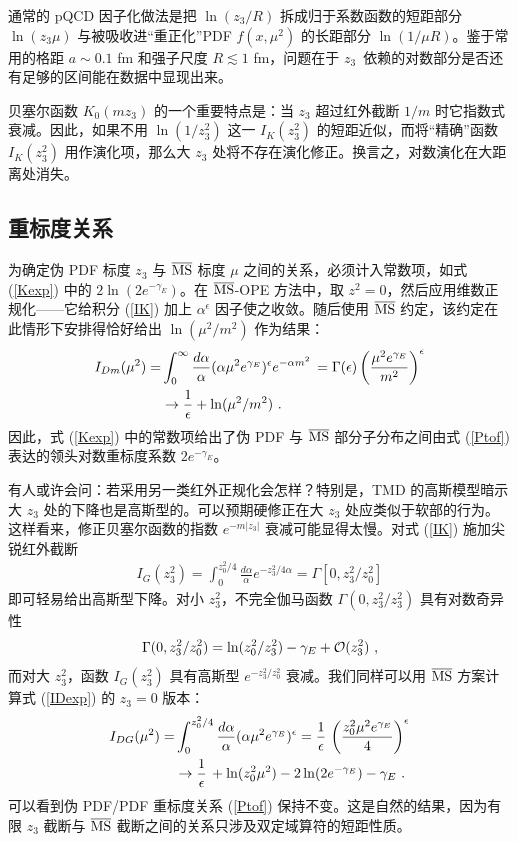 通常的 pQCD 因子化做法是把 $\ln (z_3/ R)$ 拆成归于系数函数的短距部分 $\ln (z_3 \mu)$ 与被吸收进``重正化''PDF $f(x,\mu^2)$ 的长距部分 $\ln ( 1/ \mu R )$。鉴于常用的格距 $a\sim 0.1$ fm 和强子尺度 $R \lesssim 1$ fm，问题在于 \mbox{$z_3$ 依赖}的对数部分是否还有足够的区间能在数据中显现出来。

贝塞尔函数 $K_0 (mz_3)$ 的一个重要特点是：当 $z_3$ 超过红外截断 $1/m$ 时它指数式衰减。因此，如果不用 $\ln (1/z_3^2)$ 这一 $I_K(z_3^2)$ 的短距近似，而将``精确''函数 $I_K(z_3^2)$ 用作演化项，那么大 $z_3$ 处将不存在演化修正。换言之，对数演化在大距离处消失。

\subsection{重标度关系}

为确定伪 PDF 标度 $z_3$ 与 $\overline{\rm MS}$ 标度 $\mu$ 之间的关系，必须计入常数项，如式 (\ref{Kexp}) 中的 $2 \ln (2e^{-  \gamma_E })$。在 $\overline{\rm MS}$-OPE 方法中，取 $z^2=0$，然后应用维数正规化——它给积分 (\ref{IK}) 加上 $\alpha^{\epsilon}$ 因子使之收敛。随后使用 $\overline{\rm MS}$ 约定，该约定在此情形下安排得恰好给出 $\ln (\mu^2/m^2)$ 作为结果：
   \begin{align}
  I_{Dm} (\mu^2) =& \int_0^\infty \frac{d\alpha}{\alpha}  (\alpha \mu^2 e^{\gamma_E})^{\epsilon}  e^{-   \alpha m^2} \,
  =\Gamma (\epsilon) \left ( \frac{\mu^2 e^{\gamma_E}}{m^2} \right )^\epsilon \nonumber \\  & \to
  \frac1{\epsilon}   + \ln (\mu^2/m^2)  \  .
  \label{ImM}
     \end{align}
因此，式 (\ref{Kexp}) 中的常数项给出了伪 PDF 与 $\overline{\rm MS}$ 部分子分布之间由式 (\ref{Ptof}) 表达的领头对数重标度系数 $2e^{-  \gamma_E}$。

有人或许会问：若采用另一类红外正规化会怎样？特别是，TMD 的高斯模型暗示大 $z_3$ 处的下降也是高斯型的。可以预期硬修正在大 $z_3$ 处应类似于软部的行为。这样看来，修正贝塞尔函数的指数 $e^{-m|z_3|}$ 衰减可能显得太慢。对式 (\ref{IK}) 施加尖锐红外截断
    \begin{align}
  I_G (z_3^2) = \int_0^{z_0^2/4}  \frac{d\alpha}{\alpha}    e^{-z_3^2/4\alpha } = \Gamma [0,z_3^2/z_0^2]
  \label{IDexp}
     \end{align}
即可轻易给出高斯型下降。对小 $z_3^2$，不完全伽马函数 $\Gamma (0,z_3^2/z_3^2)$ 具有对数奇异性
   \begin{align}
  \Gamma (0,z_3^2/z_0^2) =  \ln (z_0^2/z_3^2) -  \gamma_E + {\cal O} (z_3^2)  \  ,
  \label{Dexp0}
     \end{align}
     而对大 $z_3^2$，函数 $I_G (z_3^2)$ 具有高斯型 $e^{-z_3^2/z_0^2}$ 衰减。我们同样可以用 $\overline{\rm MS}$ 方案计算式 (\ref{IDexp}) 的 $z_3=0$ 版本：
  \begin{align}
  I_{DG} (\mu^2) = & \int_0^{z_0^2/4}  \frac{d\alpha}{\alpha}  (\alpha \mu^2  e^{\gamma_E})^{\epsilon}    =
  \frac1{\epsilon} \,  \left (\frac{ z_0^2  \mu^2  e^{\gamma_E}}{4}  \right )^{\epsilon} \nonumber \\  &
  \to  \frac1{\epsilon} \, + \ln (z_0^2 \mu^2    ) -2  \ln ( 2 e^{-\gamma_E}) -  \gamma_E \ .
  \label{IDexp2}
     \end{align}
可以看到伪 PDF/PDF 重标度关系 (\ref{Ptof}) 保持不变。这是自然的结果，因为有限 $z_3$ 截断与 $\overline{\rm MS}$ 截断之间的关系只涉及双定域算符的短距性质。

